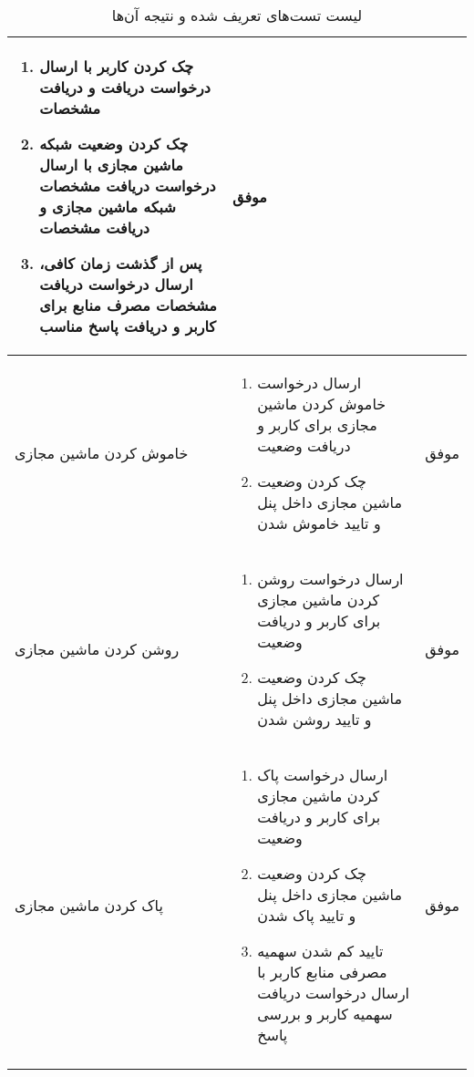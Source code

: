 \begin{center}
\begin{longtable}{ | P{2cm} | P{11cm} | c | }
{\begin{enumerate}[rightmargin=1cm,topsep=0pt,partopsep=0pt]
		\item چک کردن  کاربر با ارسال درخواست دریافت  و دریافت مشخصات
		
		\item چک کردن وضعیت شبکه ماشین مجازی با ارسال درخواست دریافت مشخصات شبکه ماشین مجازی و دریافت مشخصات
		
		\item پس از گذشت زمان کافی، ارسال درخواست دریافت مشخصات مصرف منابع برای کاربر و دریافت پاسخ مناسب
	\end{enumerate}
} &
موفق \\ \hline

 خاموش کردن ماشین مجازی&
{\footnotesize
	\begin{enumerate}[rightmargin=1cm,topsep=0pt,partopsep=0pt]
		\item ارسال درخواست خاموش کردن ماشین مجازی برای کاربر و دریافت وضعیت 
		
		\item چک کردن وضعیت ماشین مجازی داخل پنل  و تایید خاموش شدن
	\end{enumerate}
} &
موفق \\ \hline


روشن کردن ماشین مجازی&
{\footnotesize
	\begin{enumerate}[rightmargin=1cm,topsep=0pt,partopsep=0pt]
		\item ارسال درخواست روشن کردن ماشین مجازی برای کاربر و دریافت وضعیت 
		
		\item چک کردن وضعیت ماشین مجازی داخل پنل  و تایید روشن شدن
	\end{enumerate}
} &
موفق \\ \hline


پاک کردن ماشین مجازی&
{\footnotesize
	\begin{enumerate}[rightmargin=1cm,topsep=0pt,partopsep=0pt]
		\item ارسال درخواست پاک کردن ماشین مجازی برای کاربر و دریافت وضعیت 
		
		\item چک کردن وضعیت ماشین مجازی داخل پنل  و تایید پاک شدن
		
		\item تایید کم شدن سهمیه مصرفی منابع کاربر با ارسال درخواست دریافت سهمیه کاربر و بررسی پاسخ
	\end{enumerate}
} &
موفق \\ \hline
\caption{لیست تست‌های تعریف شده و نتیجه آن‌ها}
\end{longtable}
\end{center}

